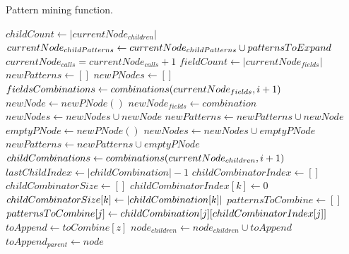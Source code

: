 \documentclass{acm_proc_article-sp-sigmod09}
\begin{document}
\begin{algorithm}
\caption{Pattern mining function.}
\label{pattern_mining}
\begin{algorithmic}[1]
\State $childCount \gets |currentNode_{children}|$
    \State $currentNode_{childPatterns} \gets cur\-rent\-Node_{child\-Pat\-terns} \cup pat\-terns\-To\-Expand$
\EndIf
\State $currentNode_{calls} = currentNode_{calls} + 1$
    \State $fieldCount \gets |currentNode_{fields}|$
    \State $newPatterns \gets []$
    \State $newPNodes \gets []$
            \State $fieldsCombinations \gets com\-bi\-na\-tions(cur\-rent\-Node_{fields}, i + 1)$
                \State $newNode \gets new PNode()$
                \State $newNode_{fields} \gets combination$
                \State $newNodes \gets newNodes \cup newNode$
                \State $newPatterns \gets newPatterns \cup newNode$
            \EndFor
        \EndFor
    \EndIf
    \State $emptyPNode \gets new PNode()$
    \State $newNodes \gets newNodes \cup emptyPNode$
    \State $newPatterns \gets newPatterns \cup emptyPNode$
        \State $childCombinations \gets com\-bi\-na\-tions(cur\-rent\-Node_{children}, i + 1)$
            \State $lastChildIndex \gets |childCombination| - 1$
            \State $childCombinatorIndex \gets []$
            \State $childCombinatorSize \gets []$
                \State $childCombinatorIndex[k] \gets 0$
                \State $childCombinatorSize[k] \gets |child\-Com\-bi\-na\-tion[k]|$
                    \State $patternsToCombine \gets []$
                        \State $patternsToCombine[j] \gets child\-Com\-bi\-na\-tion[j][child\-Com\-bi\-na\-tor\-Index[j]]$
                    \EndFor
                            \State $toAppend \gets toCombine[z]$
                            \State $node_{children} \gets node_{children} \cup toAppend$
                            \State $toAppend_{parent} \gets node$

\end{algorithmic}
\end{algorithm}
\end{document}
